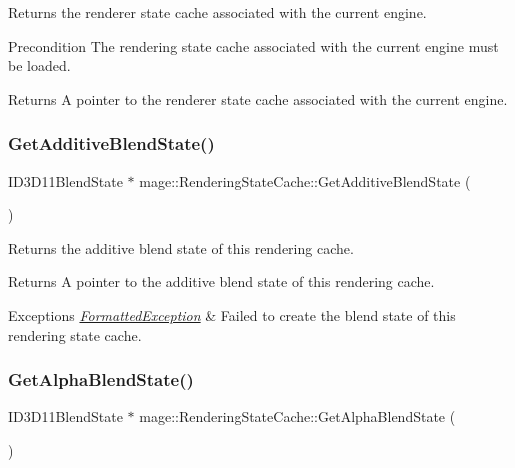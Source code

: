 Returns the renderer state cache associated with the current engine.

\begin{DoxyPrecond}{Precondition}
The rendering state cache associated with the current engine must be loaded. 
\end{DoxyPrecond}
\begin{DoxyReturn}{Returns}
A pointer to the renderer state cache associated with the current engine. 
\end{DoxyReturn}
\hypertarget{structmage_1_1_rendering_state_cache_afa897dcd0b71e4ff8e6ce6d8e31aaa71}{}\label{structmage_1_1_rendering_state_cache_afa897dcd0b71e4ff8e6ce6d8e31aaa71} 
\subsubsection{\texorpdfstring{Get\+Additive\+Blend\+State()}{GetAdditiveBlendState()}}
{\footnotesize\ttfamily I\+D3\+D11\+Blend\+State $\ast$ mage\+::\+Rendering\+State\+Cache\+::\+Get\+Additive\+Blend\+State (\begin{DoxyParamCaption}{ }\end{DoxyParamCaption})}

Returns the additive blend state of this rendering cache.

\begin{DoxyReturn}{Returns}
A pointer to the additive blend state of this rendering cache. 
\end{DoxyReturn}

\begin{DoxyExceptions}{Exceptions}
{\em \hyperlink{structmage_1_1_formatted_exception}{Formatted\+Exception}} & Failed to create the blend state of this rendering state cache. \\
\hline
\end{DoxyExceptions}
\hypertarget{structmage_1_1_rendering_state_cache_a19ad72ad35096722e3d61e58e0ab9205}{}\label{structmage_1_1_rendering_state_cache_a19ad72ad35096722e3d61e58e0ab9205} 
\subsubsection{\texorpdfstring{Get\+Alpha\+Blend\+State()}{GetAlphaBlendState()}}
{\footnotesize\ttfamily I\+D3\+D11\+Blend\+State $\ast$ mage\+::\+Rendering\+State\+Cache\+::\+Get\+Alpha\+Blend\+State (\begin{DoxyParamCaption}{ }\end{DoxyParamCaption})}

